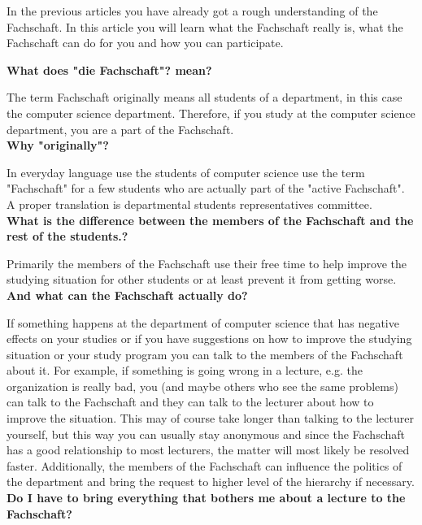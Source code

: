 {In the previous articles you have already got a rough understanding of the Fachschaft. In this article you will learn what the Fachschaft really is, what the Fachschaft can do for you and how you can participate.
}{
    \label{FSarticle}
    \textbf{What does "die Fachschaft"? mean?}

    The term Fachschaft originally means all students of a department, in this case the computer science department. Therefore, if you study at the computer science department, you are a part of the Fachschaft.\\

    \textbf{Why "originally"?}

    In everyday language use the students of computer science use the term "Fachschaft" for a few students who are actually part of the "active Fachschaft". A proper translation is departmental students representatives committee.\\

    \textbf{What is the difference between the members of the Fachschaft and the rest of the students.?}

    Primarily the members of the Fachschaft use their free time to help improve the studying situation for other students or at least prevent it from getting worse.\\

    \textbf{And what can the Fachschaft actually do?}

    If something happens at the department of computer science that has negative effects on your studies or if you have suggestions on how to improve the studying situation or your study program you can talk to the members of the Fachschaft about it. For example, if something is going wrong in a lecture, e.g. the organization is really bad, you (and maybe others who see the same problems) can talk to the Fachschaft and they can talk to the lecturer about how to improve the situation. This may of course take longer than talking to the lecturer yourself, but this way you can usually stay anonymous and since the Fachschaft has a good relationship to most lecturers, the matter will most likely be resolved faster. Additionally, the members of the Fachschaft can influence the politics of the department and bring the request to higher level of the hierarchy if necessary.\\

    \textbf{Do I have to bring everything that bothers me about a lecture to the Fachschaft?}

}
